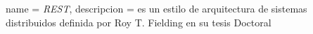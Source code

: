  {
  name = \textit{REST},
  descripcion = {es un estilo de arquitectura de sistemas distribuidos definida por Roy T. Fielding en su tesis Doctoral}
}
